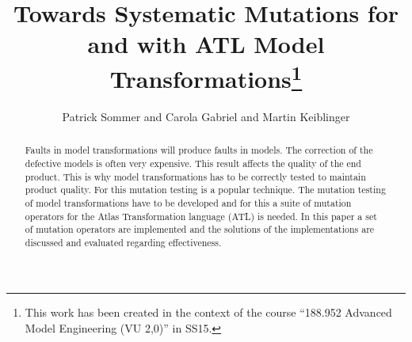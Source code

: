 \documentclass{llncs}
\begin{document}
\pagestyle{plain}

\title{Towards Systematic Mutations for and with ATL Model Transformations\footnote{This work has been created in the context of the course ``188.952 Advanced Model Engineering (VU 2,0)'' in SS15.}}


\author{Patrick Sommer and Carola Gabriel and Martin Keiblinger}


\maketitle

\begin{abstract}

Faults in model transformations will produce faults in models. The correction of
the defective models is often very expensive. This result affects the quality
of the end product. This is why model transformations has to be correctly tested
to maintain product quality. For this mutation testing is a popular technique.  The mutation testing of model transformations have to be developed and for this a suite of mutation operators for the Atlas Transformation language (ATL) is needed. In this paper a set of mutation operators are implemented and the solutions of the implementations are discussed and evaluated regarding effectiveness.

\end{abstract}

\tableofcontents
\newpage
\end{document}
